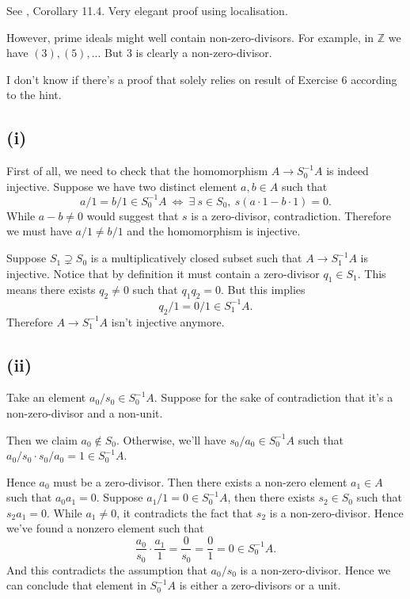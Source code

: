 See \cite{altman}, Corollary 11.4. Very elegant proof using localisation. 

However, prime ideals might well contain non-zero-divisors. For example, in $\mathbb Z$ we have $(3), (5),...$ But $3$ is clearly a non-zero-divisor.

I don't know if there's a proof that solely relies on result of Exercise 6 according to the hint.


\subsection{(i)}

First of all, we need to check that the homomorphism $A\to S_0^{-1}A$ is indeed injective. Suppose we have two distinct element $a,b\in A$ such that \[a/1=b/1\in S_0^{-1}A ~\Leftrightarrow~ \exists~s\in S_0,~ s(a\cdot 1-b\cdot 1)=0.\] While $a-b\neq 0$ would suggest that $s$ is a zero-divisor, contradiction. Therefore we must have $a/1\neq b/1$ and the homomorphism is injective. 

Suppose $S_1\supsetneq S_0$ is a multiplicatively closed subset such that $A\to S_1^{-1}A$ is injective. Notice that by definition it must contain a zero-divisor $q_1\in S_1$. This means there exists $q_2\neq 0$ such that $q_1q_2=0$. But this implies \[q_2/1=0/1\in S_1^{-1}A.\] Therefore $A\to S_1^{-1}A$ isn't injective anymore. 

\subsection{(ii)}

Take an element $a_0/s_0\in S_0^{-1}A$. Suppose for the sake of contradiction that it's a non-zero-divisor and a non-unit. 

Then we claim $a_0\notin S_0$. Otherwise, we'll have $s_0/a_0\in S_0^{-1}A$ such that $a_0/s_0\cdot s_0/a_0=1\in S_0^{-1}A$. 

Hence $a_0$ must be a zero-divisor. Then there exists a non-zero element $a_1\in A$ such that $a_0a_1=0$. Suppose $a_1/1=0\in S_0^{-1}A$, then there exists $s_2\in S_0$ such that $s_2a_1=0$. While $a_1\neq 0$, it contradicts the fact that $s_2$ is a non-zero-divisor. Hence we've found a nonzero element such that 
\[\frac{a_0}{s_0}\cdot \frac{a_1}{1}=\frac{0}{s_0}=\frac{0}{1}=0\in S_0^{-1}A.\]
And this contradicts the assumption that $a_0/s_0$ is a non-zero-divisor. Hence we can conclude that element in $S_0^{-1}A$ is either a zero-divisors or a unit.

